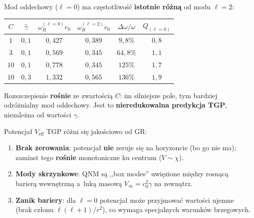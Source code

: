 \begin{proposition}%
\label{prop:breathing-splitting}
Mod oddechowy ($\ell = 0$) ma cz\k{e}stotliwo\'s\'c
\textbf{istotnie r\'o\.zn\k{a}} od modu $\ell = 2$:
\begin{center}
\begin{tabular}{cccccc}
\toprule
$C$ & $\hat\gamma$ &
  $\omega_R^{(\ell=0)}r_0$ & $\omega_R^{(\ell=2)}r_0$ &
  $\Delta\omega/\omega$ & $Q_{(\ell=0)}$ \\
\midrule
$1$ & $0{,}1$ & $0{,}427$ & $0{,}389$ & $9{,}8\%$ & $0{,}8$ \\
$3$ & $0{,}1$ & $0{,}569$ & $0{,}345$ & $64{,}8\%$ & $1{,}1$ \\
$10$ & $0{,}1$ & $0{,}778$ & $0{,}345$ & $125\%$ & $1{,}7$ \\
$10$ & $0{,}3$ & $1{,}332$ & $0{,}565$ & $136\%$ & $1{,}9$ \\
\bottomrule
\end{tabular}
\end{center}
Rozszczepienie \textbf{ro\'snie} ze zwarto\'sci\k{a} $C$:
im silniejsze pole, tym bardziej od\-r\'o\.z\-nial\-ny mod oddechowy.
Jest to \textbf{nieredukowalna predykcja TGP}, niezale\.zna
od warto\'sci $\gamma$.
\end{proposition}

\begin{remark}\label{rem:strong-V}
Potencja\l{} $V_{\mathrm{eff}}$ TGP r\'o\.zni si\k{e} jako\'sciowo
od GR:
\begin{enumerate}[nosep]
  \item \textbf{Brak zerowania}: potencja\l{} \textbf{nie} zeruje
    si\k{e} na horyzoncie (bo go nie ma); zamiast tego
    \textbf{ro\'snie} monotoniczne ku centrum ($V \sim \chi$).
  \item \textbf{Mody skrzynkowe}: QNM s\k{a}
    ,,box modes'' uwi\k{e}zione mi\k{e}dzy rosn\k{a}c\k{a}
    barier\k{a} wewn\k{e}trzn\k{a} a~luk\k{a} masow\k{a}
    $V_\infty = c_0^2\gamma$ na zewn\k{a}trz.
  \item \textbf{Zanik bariery}: dla $\ell = 0$
    potencja\l{} mo\.ze przyjmowa\'c warto\'sci ujemne
    (brak cz\l{}onu $\ell(\ell+1)/r^2$), co wymaga
    specjalnych warunk\'ow brzegowych.
\end{enumerate}
\end{remark}

